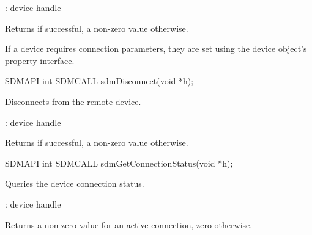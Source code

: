 \documentclass[a4paper,12pt,twoside,extrafontsizes]{memoir}
\begin{document}
\begin{funcparams}
	: device handle
\end{funcparams}

\begin{funcret}
	Returns  if successful, a non-zero value otherwise.
\end{funcret}

\begin{funcremarks}
	If a device requires connection parameters, they are set using the device object's property interface.
\end{funcremarks}



\begin{cfuncprototype}
SDMAPI int SDMCALL sdmDisconnect(void *h);
\end{cfuncprototype}

\begin{funcdescr}
	Disconnects from the remote device.
\end{funcdescr}

\begin{funcparams}
	: device handle
\end{funcparams}

\begin{funcret}
	Returns  if successful, a non-zero value otherwise.
\end{funcret}



\begin{cfuncprototype}
SDMAPI int SDMCALL sdmGetConnectionStatus(void *h);
\end{cfuncprototype}

\begin{funcdescr}
	Queries the device connection status.
\end{funcdescr}

\begin{funcparams}
	: device handle
\end{funcparams}

\begin{funcret}
	Returns a non-zero value for an active connection, zero otherwise.
\end{funcret}
\end{document}
